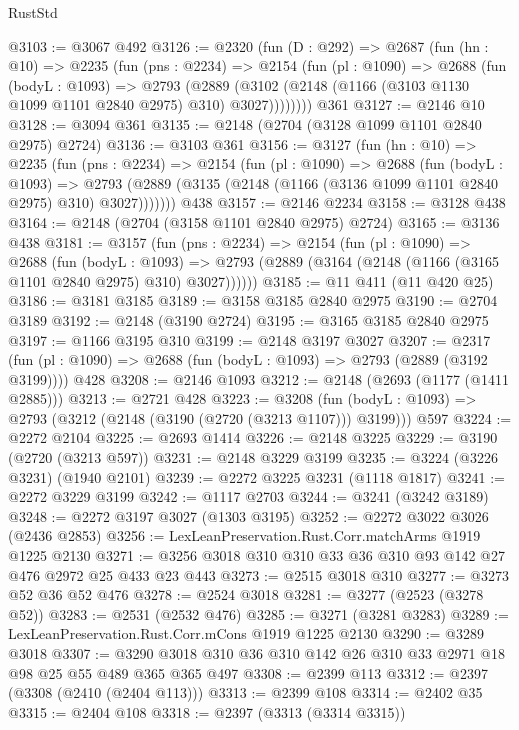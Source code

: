 \begin{lexlean}{RustStd}
\begin{coremodule}
@3103 := @3067 @492
@3126 := @2320
    (fun (D : @292) =>
    @2687
      (fun (hn : @10) =>
      @2235
        (fun (pns : @2234) =>
        @2154
          (fun (pl : @1090) =>
          @2688
            (fun (bodyL : @1093) =>
            @2793
              (@2889 (@3102 (@2148 (@1166 (@3103 @1130 @1099 @1101 @2840 @2975) @310) @3027))))))))
    @361
@3127 := @2146 @10
@3128 := @3094 @361
@3135 := @2148 (@2704 (@3128 @1099 @1101 @2840 @2975) @2724)
@3136 := @3103 @361
@3156 := @3127
    (fun (hn : @10) =>
    @2235
      (fun (pns : @2234) =>
      @2154
        (fun (pl : @1090) =>
        @2688
          (fun (bodyL : @1093) =>
          @2793 (@2889 (@3135 (@2148 (@1166 (@3136 @1099 @1101 @2840 @2975) @310) @3027)))))))
    @438
@3157 := @2146 @2234
@3158 := @3128 @438
@3164 := @2148 (@2704 (@3158 @1101 @2840 @2975) @2724)
@3165 := @3136 @438
@3181 := @3157
    (fun (pns : @2234) =>
    @2154
      (fun (pl : @1090) =>
      @2688
        (fun (bodyL : @1093) =>
        @2793 (@2889 (@3164 (@2148 (@1166 (@3165 @1101 @2840 @2975) @310) @3027))))))
@3185 := @11 @411 (@11 @420 @25)
@3186 := @3181 @3185
@3189 := @3158 @3185 @2840 @2975
@3190 := @2704 @3189
@3192 := @2148 (@3190 @2724)
@3195 := @3165 @3185 @2840 @2975
@3197 := @1166 @3195 @310
@3199 := @2148 @3197 @3027
@3207 := @2317 (fun (pl : @1090) => @2688 (fun (bodyL : @1093) => @2793 (@2889 (@3192 @3199)))) @428
@3208 := @2146 @1093
@3212 := @2148 (@2693 (@1177 (@1411 @2885)))
@3213 := @2721 @428
@3223 := @3208
    (fun (bodyL : @1093) => @2793 (@3212 (@2148 (@3190 (@2720 (@3213 @1107))) @3199)))
    @597
@3224 := @2272 @2104
@3225 := @2693 @1414
@3226 := @2148 @3225
@3229 := @3190 (@2720 (@3213 @597))
@3231 := @2148 @3229 @3199
@3235 := @3224 (@3226 @3231) (@1940 @2101)
@3239 := @2272 @3225 @3231 (@1118 @1817)
@3241 := @2272 @3229 @3199
@3242 := @1117 @2703
@3244 := @3241 (@3242 @3189)
@3248 := @2272 @3197 @3027 (@1303 @3195)
@3252 := @2272 @3022 @3026 (@2436 @2853)
@3256 := LexLeanPreservation.Rust.Corr.matchArms @1919 @1225 @2130
@3271 := @3256 @3018 @310 @310 @33 @36 @310 @93 @142 @27 @476 @2972 @25 @433 @23 @443
@3273 := @2515 @3018 @310
@3277 := @3273 @52 @36 @52 @476
@3278 := @2524 @3018
@3281 := @3277 (@2523 (@3278 @52))
@3283 := @2531 (@2532 @476)
@3285 := @3271 (@3281 @3283)
@3289 := LexLeanPreservation.Rust.Corr.mCons @1919 @1225 @2130
@3290 := @3289 @3018
@3307 := @3290 @3018 @310 @36 @310 @142 @26 @310 @33 @2971 @18 @98 @25 @55 @489 @365 @365 @497
@3308 := @2399 @113
@3312 := @2397 (@3308 (@2410 (@2404 @113)))
@3313 := @2399 @108
@3314 := @2402 @35
@3315 := @2404 @108
@3318 := @2397 (@3313 (@3314 @3315))

\end{coremodule}
\end{lexlean}
